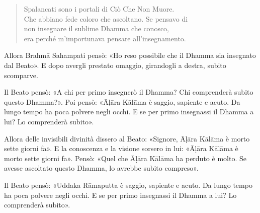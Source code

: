 \begin{quote}

  Spalancati sono i portali di Ciò Che Non Muore. \\
  Che abbiano fede coloro che ascoltano.
  Se pensavo di \\
  non insegnare il sublime Dhamma che conosco, \\
  era perché m’importunava pensare all’insegnamento.

\end{quote}

Allora Brahmā Sahampati pensò: «Ho reso possibile che il Dhamma sia insegnato
dal Beato». E dopo avergli prestato omaggio, girandogli a destra, subito
scomparve.


Il Beato pensò: «A chi per primo insegnerò il Dhamma? Chi comprenderà subito
questo Dhamma?». Poi pensò: «Āḷāra Kālāma è saggio, sapiente e acuto. Da lungo
tempo ha poca polvere negli occhi. E se per primo insegnassi il Dhamma a lui? Lo
comprenderà subito».

Allora delle invisibili divinità dissero al Beato: «Signore, Āḷāra Kālāma è
morto sette giorni fa». E la conoscenza e la visione sorsero in lui: «Āḷāra
Kālāma è morto sette giorni fa». Pensò: «Quel che Āḷāra Kālāma ha perduto è
molto. Se avesse ascoltato questo Dhamma, lo avrebbe subito compreso».

Il Beato pensò: «Uddaka Rāmaputta è saggio, sapiente e acuto. Da lungo tempo ha
poca polvere negli occhi. E se per primo insegnassi il Dhamma a lui? Lo
comprenderà subito».

